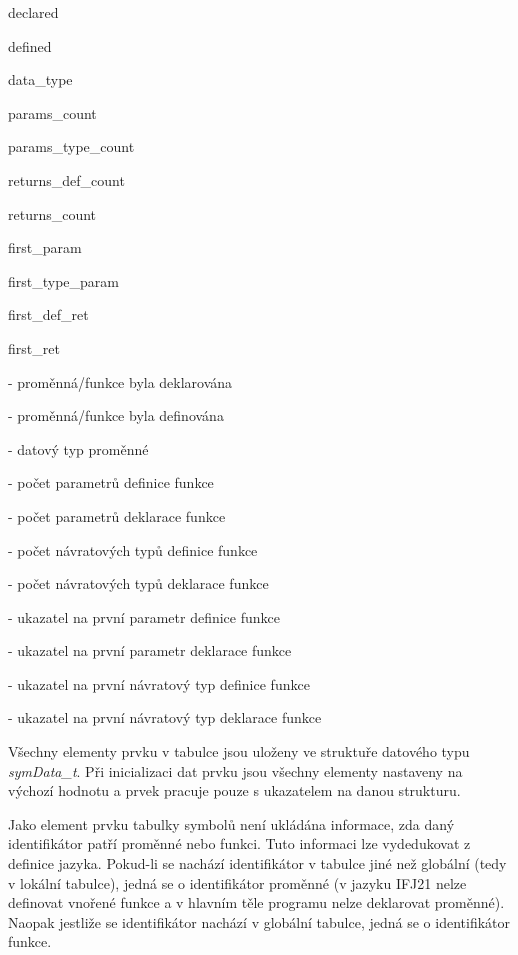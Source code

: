 \documentclass[a4paper, 12pt]{article}
\begin{document}
\begin{itemize}
    \begin{minipage}{0.3\linewidth}   
    \item declared
    \item defined
    \item data\_type
    \item params\_count
    \item params\_type\_count
    \item returns\_def\_count
    \item returns\_count    
    \item first\_param
    \item first\_type\_param
    \item first\_def\_ret
    \item first\_ret
    \end{minipage}
    \begin{minipage}{0.65\linewidth}   
    \item[-] proměnná/funkce byla deklarována
    \item[-] proměnná/funkce byla definována
    \item[-] datový typ proměnné
    \item[-] počet parametrů definice funkce
    \item[-] počet parametrů deklarace funkce
    \item[-] počet návratových typů definice funkce
    \item[-] počet návratových typů deklarace funkce    
    \item[-] ukazatel na první parametr definice funkce
    \item[-] ukazatel na první parametr deklarace funkce
    \item[-] ukazatel na první návratový typ definice funkce
    \item[-] ukazatel na první návratový typ deklarace funkce
    \end{minipage}
\end{itemize}

\vspace{1cm}

Všechny elementy prvku v tabulce jsou uloženy ve struktuře datového typu \textit{symData\_t}. Při inicializaci dat prvku jsou všechny elementy nastaveny na výchozí hodnotu a prvek pracuje pouze s ukazatelem na danou strukturu.

Jako element prvku tabulky symbolů není ukládána informace, zda daný identifikátor patří proměnné nebo funkci. Tuto informaci lze vydedukovat z definice jazyka. Pokud-li se nachází identifikátor v tabulce jiné než globální (tedy v lokální tabulce), jedná se o identifikátor proměnné (v jazyku IFJ21 nelze definovat vnořené funkce a v hlavním těle programu nelze deklarovat proměnné). Naopak jestliže se identifikátor nachází v globální tabulce, jedná se o identifikátor funkce.
\end{document}
